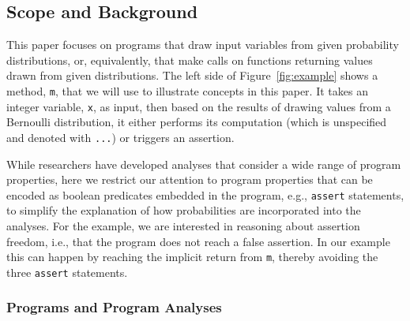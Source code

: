 \subsection{Scope and Background}
\label{sec:background}



This paper focuses on programs that draw input variables
from given probability distributions, or, equivalently, that make
calls on functions returning values drawn from given distributions.
The left side of Figure~\ref{fig:example} shows a method,
\texttt{m}, that we will use to illustrate concepts in this paper.     
It takes an integer variable, \texttt{x}, as input, then based on the 
results of drawing values from a Bernoulli distribution,
it either performs its computation
(which is unspecified and denoted with \texttt{...}) or triggers
an assertion. 

While researchers have developed analyses that consider a wide
range of program properties, here
we restrict our attention to program
properties that can be encoded as boolean predicates 
embedded in the program,
e.g., \texttt{assert} statements, to simplify the explanation
of how probabilities are incorporated into the analyses.
For the example, we are interested in reasoning about
assertion freedom, i.e., that the program does
not reach a false assertion.
In our example
this can happen by reaching the implicit return from \texttt{m},
thereby avoiding the three \texttt{assert} statements.


\subsubsection{Programs and Program Analyses}

